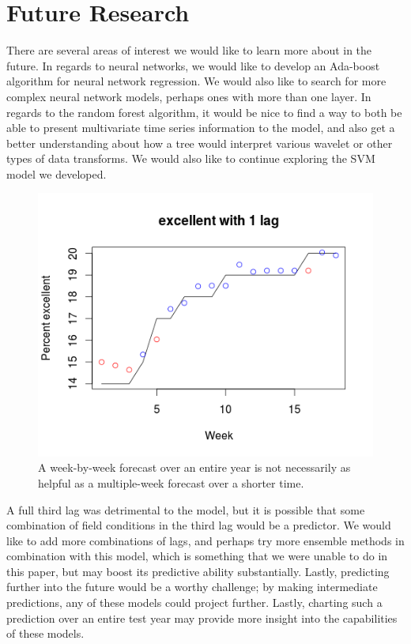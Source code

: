 \documentclass[a4paper]{apa6}
\begin{document}
\section*{Future Research}
There are several areas of interest we would like to learn more about in the future. In regards to neural networks, we would like to develop an Ada-boost algorithm for neural network regression. We would also like to search for more complex neural network models, perhaps ones with more than one layer. In regards to the random forest algorithm, it would be nice to find a way to both be able to present multivariate time series information to the model, and also get a better understanding about how a tree would interpret various wavelet or other types of data transforms. We would also like to continue exploring the SVM model we developed. 
\begin{figure}
\includegraphics[width=0.8\linewidth]{excellentyear15.png}
\caption{A week-by-week forecast over an entire year is not necessarily as helpful as a multiple-week forecast over a shorter time.}
\end{figure}

A full third lag was detrimental to the model, but it is possible that some combination of field conditions in the third lag would be a predictor.  We would like to add more combinations of lags, and perhaps try more ensemble methods in combination with this model, which is something that we were unable to do in this paper, but may boost its predictive ability substantially.  Lastly, predicting further into the future would be a worthy challenge; by making intermediate predictions, any of these models could project further.  Lastly, charting such a prediction over an entire test year may provide more insight into the capabilities of these models.
\end{document}
